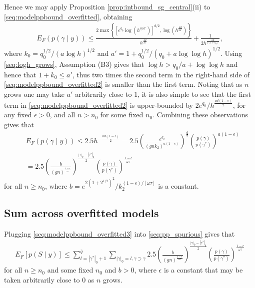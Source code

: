 Hence we may apply Proposition \ref{prop:intbound_sg_central}(ii) to \eqref{seq:modelppbound_overfitted}, obtaining
\begin{align}
 E_F (p(\gamma \mid y)) \leq 
\frac{2 \max \left\{  [e^{q_0} \log(h^{a/a'})]^{d/2}, \log\left(h^{\frac{ad}{2a'}}\right)\right\}}{h^{\frac{ad}{2a'}}} + \frac{1}{2 h^{\frac{ad}{2(1+k_0)}}},
\label{seq:modelppbound_overfitted2}
\end{align}
where $k_0= q_0^{1/2}/(a \log h)^{1/2}$ and 
$a'= 1 + q_0^{1/2}/(q_0 + a \log\log h)^{1/2}$.
Using \eqref{seq:logh_grows}, Assumption (B3) gives that $\log h > q_0/a + \log\log h$ and hence that $1+ k_0 \leq a'$, thus two times the second term in the right-hand side of \eqref{seq:modelppbound_overfitted2} is smaller than the first term.
Noting that as $n$ grows one may take $a'$ arbitrarily close to 1, it is also simple to see that the first term in \eqref{seq:modelppbound_overfitted2} is upper-bounded by $2 e^{q_0}/h^{\frac{ad(1-\epsilon)}{2}}$, for any fixed $\epsilon >0$, and all $n > n_0$ for some fixed $n_0$. Combining these observations gives that
\begin{align}
& E_F (p(\gamma \mid y)) \leq 2.5 h^{-\frac{ad(1-\epsilon)}{2}}
=2.5 \left( \frac{e^{q_0}}{(g n k_2)^{a (1-\epsilon)}} \right)^{\frac{d}{2}} \left( \frac{p(\gamma)}{p(\gamma^*)} \right)^{a (1-\epsilon)}
\nonumber \\
&=2.5 \left( \frac{b}{(g n)^{\frac{1-\epsilon}{\omega \tau}}} \right)^{\frac{|\gamma|_0 - |\gamma^*|_0}{2}} \left( \frac{p(\gamma)}{p(\gamma^*)} \right)^{\frac{1-\epsilon}{\omega \tau}}
 \label{seq:modelppbound_overfitted3}
\end{align}
for all $n \geq n_0$, where $b= e^{2(1+2^{1/2})^2}/k_2^{(1-\epsilon)/[\omega \tau]}$ is a constant.


\subsection{Sum across overfitted models}


Plugging \eqref{seq:modelppbound_overfitted3} into \eqref{seq:pp_spurious} gives that
\begin{align}
 E_F[p(S \mid y)] \leq \sum_{l=|\gamma^*|_0+1}^{\bar{q}} \sum_{|\gamma|_0=l, \gamma \supset \gamma} 
2.5 \left( \frac{b}{(g n)^{\frac{1-\epsilon}{\omega \tau}}} \right)^{\frac{|\gamma|_0 - |\gamma^*|_0}{2}} 
\left( \frac{p(\gamma)}{p(\gamma^*)} \right)^{\frac{1-\epsilon}{\omega \tau}}
\label{seq:pp_spurious_bound}
\end{align}
for all $n \geq n_0$ and some fixed $n_0$ and $b>0$, where $\epsilon$ is a constant that may be taken arbitrarily close to 0 as $n$ grows.

